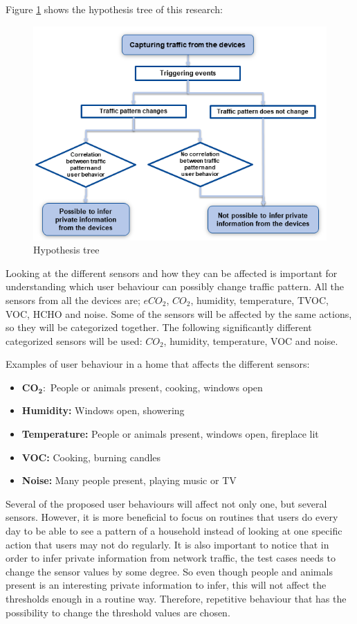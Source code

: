 Figure \ref{fig:HypothesisTree} shows the hypothesis tree of this research:

\begin{figure} [H]
    \includegraphics[width=1\textwidth]{figures/Hypothesistree.png}
    \caption{Hypothesis tree}
    \label{fig:HypothesisTree}
\end{figure}

Looking at the different sensors and how they can be affected is important for understanding which user behaviour can possibly change traffic pattern. All the sensors from all the devices are; \(eCO_2\), \(CO_2\), humidity, temperature, \gls{TVOC}, \gls{VOC}, HCHO and noise. Some of the sensors will be affected by the same actions, so they will be categorized together. The following significantly different categorized sensors will be used: \(CO_2\), humidity, temperature, VOC and noise. 

Examples of user behaviour in a home that affects the different sensors:
\begin{itemize}
    \item $\mathbf{CO_2:}$ People or animals present, cooking, windows open
    \item \textbf{Humidity:} Windows open, showering
    \item \textbf{Temperature:} People or animals present, windows open, fireplace lit
    \item \textbf{VOC:} Cooking, burning candles
    \item \textbf{Noise:} Many people present, playing music or TV
\end{itemize}

Several of the proposed user behaviours will affect not only one, but several sensors. However, it is more beneficial to focus on routines that users do every day to be able to see a pattern of a household instead of looking at one specific action that users may not do regularly. It is also important to notice that in order to infer private information from network traffic, the test cases needs to change the sensor values by some degree. So even though people and animals present is an interesting private information to infer, this will not affect the thresholds enough in a routine way. Therefore, repetitive behaviour that has the possibility to change the threshold values are chosen. 

